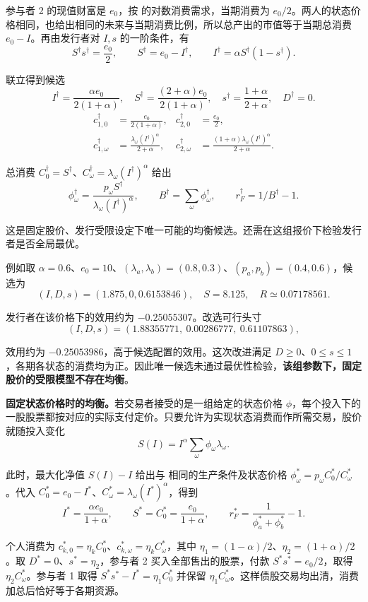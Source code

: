 \begin{solution}[blank-type=manual,blank-vsep=9\baselineskip]
\begin{enumerate}[label=(\alph*)]
参与者 2 的现值财富是 $e_0$，按 的对数消费需求，当期消费为 $e_0/2$。两人的状态价格相同，也给出相同的未来与当期消费比例，所以总产出的市值等于当期总消费 $e_0-I$。再由发行者对 $I,s$ 的一阶条件，有
\[
 S^{\dagger}s^{\dagger}=\frac{e_0}{2},\qquad
 S^{\dagger}=e_0-I^{\dagger},\qquad I^{\dagger}=\alpha S^{\dagger}(1-s^{\dagger}).
\]

联立得到候选
\[
 \boxed{I^{\dagger}=\frac{\alpha e_0}{2(1+\alpha)},\quad
 S^{\dagger}=\frac{(2+\alpha)e_0}{2(1+\alpha)},\quad
 s^{\dagger}=\frac{1+\alpha}{2+\alpha},\quad D^{\dagger}=0}.
\]
\[
 \begin{aligned}
 c_{1,0}^{\dagger}&=\frac{e_0}{2(1+\alpha)},& c_{2,0}^{\dagger}&=\frac{e_0}{2},\\
 c_{1,\omega}^{\dagger}&=\frac{\lambda_\omega(I^{\dagger})^\alpha}{2+\alpha},&
 c_{2,\omega}^{\dagger}&=\frac{(1+\alpha)\lambda_\omega(I^{\dagger})^\alpha}{2+\alpha}.
 \end{aligned}
\]

总消费 $C_0^{\dagger}=S^{\dagger}$、$C_\omega^{\dagger}=\lambda_\omega(I^{\dagger})^\alpha$ 给出
\[
 \phi_\omega^{\dagger}=\frac{p_\omega S^{\dagger}}{\lambda_\omega(I^{\dagger})^\alpha},\qquad
 B^{\dagger}=\sum_\omega\phi_\omega^{\dagger},\qquad r_F^{\dagger}=1/B^{\dagger}-1.
\]

这是固定股价、发行受限设定下唯一可能的均衡候选。还需在这组报价下检验发行者是否全局最优。

例如取 $\alpha=0.6$、$e_0=10$、$(\lambda_a,\lambda_b)=(0.8,0.3)$、$(p_a,p_b)=(0.4,0.6)$，候选为
\[
 (I,D,s)=(1.875,0,0.6153846),\quad S=8.125,\quad R\simeq0.07178561.
\]

发行者在该价格下的效用约为 $-0.25055307$。改选可行头寸
\[
 (I,D,s)=(1.88355771,\ 0.00286777,\ 0.61107863),
\]

效用约为 $-0.25053986$，高于候选配置的效用。这次改进满足 $D\ge0$、$0\le s\le1$，各期各状态的消费均为正。因此唯一候选未通过最优性检验，\textbf{该组参数下，固定股价的受限模型不存在均衡}。

\textbf{固定状态价格时的均衡。}若交易者接受的是一组给定的状态价格 $\phi$，每个投入下的一股股票都按对应的实际支付定价。只要允许为实现状态消费而作所需交易，股价就随投入变化
\[
 S(I)=I^\alpha\sum_\omega\phi_\omega\lambda_\omega.
\]

此时，最大化净值 $S(I)-I$ 给出与 相同的生产条件及状态价格 $\phi_\omega^*=p_\omega C_0^*/C_\omega^*$。代入 $C_0^*=e_0-I^*$、$C_\omega^*=\lambda_\omega(I^*)^\alpha$，得到
\[
 I^*=\frac{\alpha e_0}{1+\alpha},\qquad S^*=C_0^*=\frac{e_0}{1+\alpha},\qquad
 r_F^*=\frac{1}{\phi_a^*+\phi_b^*}-1 .
\]

个人消费为 $c_{k,0}^*=\eta_k C_0^*$、$c_{k,\omega}^*=\eta_k C_\omega^*$，其中 $\eta_1=(1-\alpha)/2$、$\eta_2=(1+\alpha)/2$。取 $D^*=0$、$s^*=\eta_2$，参与者 2 买入全部售出的股票，付款 $S^*s^*=e_0/2$，取得 $\eta_2 C_\omega^*$。参与者 1 取得 $S^*s^*-I^*=\eta_1 C_0^*$ 并保留 $\eta_1 C_\omega^*$。这样债股交易均出清，消费加总后恰好等于各期资源。\qedhere
\end{enumerate}
\end{solution}

